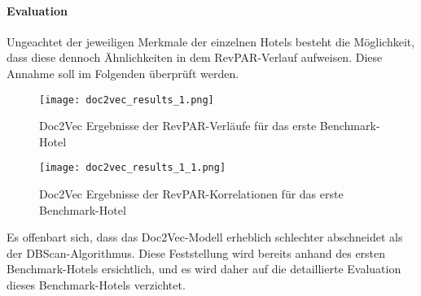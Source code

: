 \paragraph{Evaluation}
Ungeachtet der jeweiligen Merkmale der einzelnen Hotels besteht die Möglichkeit, dass diese dennoch Ähnlichkeiten in dem RevPAR-Verlauf aufweisen. Diese Annahme soll im Folgenden überprüft werden.

\begin{figure}[h]
    \centering
    \texttt{[image: doc2vec\_results\_1.png]}
    \caption[Doc2Vec Ergebnisse der RevPAR-Verläufe für das erste Benchmark-Hotel]{Doc2Vec Ergebnisse der RevPAR-Verläufe für das erste Benchmark-Hotel}
    \label{img:doc2vec_results_1}
\end{figure}

\begin{figure}[h]
    \centering
    \texttt{[image: doc2vec\_results\_1\_1.png]}
    \caption[Doc2Vec Ergebnisse der RevPAR-Korrelationen für das erste Benchmark-Hotel]{Doc2Vec Ergebnisse der RevPAR-Korrelationen für das erste Benchmark-Hotel}
    \label{img:doc2vec_results_1_1}
\end{figure}

Es offenbart sich, dass das Doc2Vec-Modell erheblich schlechter abschneidet als der DBScan-Algorithmus. Diese Feststellung wird bereits anhand des ersten Benchmark-Hotels ersichtlich, und es wird daher auf die detaillierte Evaluation dieses Benchmark-Hotels verzichtet.